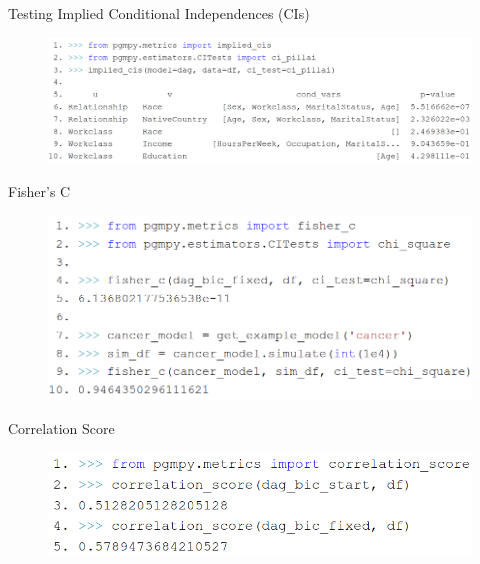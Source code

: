 \documentclass{beamer}
\begin{document}
\begin{frame}{Testing Implied Conditional Independences (CIs)}
	\begin{figure}
		\includegraphics[scale=0.27]{imgs/implied_cis.png}
	\end{figure}
\end{frame}

\begin{frame}{Fisher's C}
	\vspace{2em}
	\begin{figure}
		\centering
		\includegraphics[scale=0.3]{imgs/fisherc.png}
	\end{figure}
\end{frame}

\begin{frame}{Correlation Score}
	\vspace{2em}
	\begin{figure}
		\centering
		\includegraphics[scale=0.3]{imgs/corr_score.png}
	\end{figure}

\end{frame}
\end{document}
